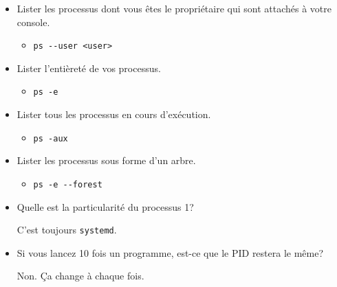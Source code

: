 \documentclass[a4paper]{article}
\begin{document}
\begin{itemize}

\item Lister les processus dont vous êtes le propriétaire qui sont attachés à votre console.
\begin{example}
    \begin{itemize}
        \item \texttt{ps -{}-user <user>}
    \end{itemize}
\end{example}

\item Lister l'entièreté de vos processus.
\begin{example}
    \begin{itemize}
        \item \texttt{ps -e}
    \end{itemize}
\end{example}

\item Lister tous les processus en cours d’exécution.
\begin{example}
    \begin{itemize}
        \item \texttt{ps -aux}
    \end{itemize}
\end{example}

\item Lister les processus sous forme d'un arbre.
\begin{example}
    \begin{itemize}
        \item \texttt{ps -e -{}-forest}
    \end{itemize}
\end{example}

\item Quelle est la particularité du processus 1?
\begin{example}
    C'est toujours \texttt{systemd}.
\end{example}

\item Si vous lancez 10 fois un programme, est-ce que le PID restera le même?
\begin{example}
    Non. Ça change à chaque fois.
\end{example}


\end{itemize}
\end{document}
